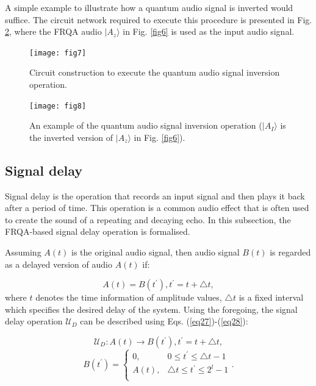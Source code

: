 \documentclass[10pt,journal,compsoc]{IEEEtran}
\begin{document}
A simple example to illustrate how a quantum audio signal is inverted would suffice. The circuit network required to execute this procedure is presented in Fig. \ref{fig8}, where the FRQA audio $\vert A_z\rangle$ in Fig. \ref{fig6} is used as the input audio signal.

\begin{figure}[!t]
\centering
\texttt{[image: fig7]}
\caption{Circuit construction to execute the quantum audio signal inversion operation.}
\label{fig7}
\end{figure}

\begin{figure}[!t]
\centering
\texttt{[image: fig8]}
\caption{An example of the quantum audio signal inversion operation ($\vert A_I\rangle$ is the inverted version of $\vert A_z\rangle$ in Fig. \ref{fig6}).}
\label{fig8}
\end{figure}

\subsection{Signal delay}\label{sec3-3}
Signal delay is the operation that records an input signal and then plays it back after a period of time. This operation is a common audio effect that is often used to create the sound of a repeating and decaying echo. In this subsection, the FRQA-based signal delay operation is formalised.

Assuming $A(t)$ is the original audio signal, then audio signal $B(t)$ is regarded as a delayed version of audio $A(t)$ if:

\begin{equation}\label{eq26}
A(t) = B(t^{\prime}), t^{\prime} = t + \triangle{t},
\end{equation}
where $t$ denotes the time information of amplitude values, $\triangle{t}$ is a fixed interval which specifies the desired delay of the system. Using the foregoing, the signal delay operation $\mathcal{U}_D$ can be described using Eqs. (\ref{eq27})-(\ref{eq28}):

\begin{equation}\label{eq27}
\mathcal{U}_{D} : A(t) \rightarrow B(t^{\prime}), t^{\prime} = t + \triangle{t},
\end{equation}
\begin{equation}\label{eq28}
B(t^{\prime}) = \left \{ \begin{array}{ll}
0 , & 0 \leq t^{\prime} \leq \triangle{t-1}\\
A(t) , & \triangle{t} \leq t^{\prime} \leq 2^{l}-1\\
\end{array}\right..
\end{equation}
\end{document}
